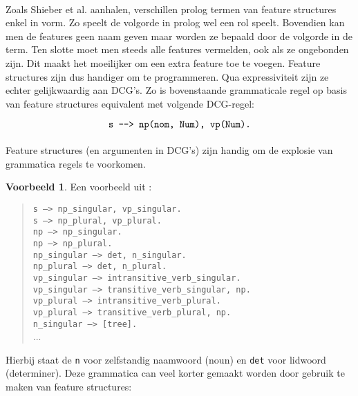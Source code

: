 \documentclass[]{article}
\theoremstyle{definition}
\newtheorem{ex}{Voorbeeld}[section]
\begin{document}
\paragraph{} Zoals Shieber et al. \cite{Shieber2003} aanhalen, verschillen prolog termen van feature structures enkel in vorm. Zo speelt de volgorde in prolog wel een rol speelt. Bovendien kan men de features geen naam geven maar worden ze bepaald door de volgorde in de term. Ten slotte moet men steeds alle features vermelden, ook als ze ongebonden zijn. Dit maakt het moeilijker om een extra feature toe te voegen. Feature structures zijn dus handiger om te programmeren. Qua expressiviteit zijn ze echter gelijkwaardig aan DCG's. Zo is bovenstaande grammaticale regel op basis van feature structures equivalent met volgende DCG-regel:

\[
    \texttt{s ---> np(nom, Num), vp(Num).} \\
\]

\paragraph{} Feature structures (en argumenten in DCG's) zijn handig om de explosie van grammatica regels te voorkomen.
\begin{ex}  Een voorbeeld uit \cite{NLPCourse}:
  \label{ex:explosion}
  \begin{quote}
    \texttt{s ---> np\_{singular}, vp\_{singular}.} \\
    \texttt{s ---> np\_{plural}, vp\_{plural}.} \\
    \texttt{np ---> np\_{singular}.} \\
    \texttt{np ---> np\_{plural}.} \\
    \texttt{np\_{singular} ---> det, n\_{singular}.} \\
    \texttt{np\_{plural} ---> det, n\_{plural}.} \\
    \texttt{vp\_{singular} ---> intransitive\_verb\_{singular}.} \\
    \texttt{vp\_{singular} ---> transitive\_verb\_{singular}, np.} \\
    \texttt{vp\_{plural} ---> intransitive\_verb\_{plural}.} \\
    \texttt{vp\_{plural} ---> transitive\_verb\_{plural}, np.} \\
    \texttt{n\_singular ---> [tree].} \\
    ...
  \end{quote}
\end{ex} 
Hierbij staat de \texttt{n} voor zelfstandig naamwoord (noun) en \texttt{det} voor lidwoord (determiner). Deze grammatica can veel korter gemaakt worden door gebruik te maken van feature structures:
\end{document}
